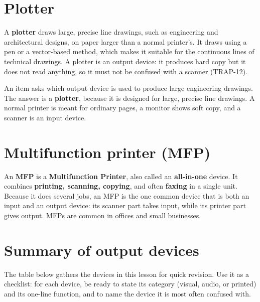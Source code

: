 \section{Plotter}
A \textbf{plotter} draws large, precise line drawings, such as engineering and
architectural designs, on paper larger than a normal printer's. It draws using
a pen or a vector-based method, which makes it suitable for the continuous
lines of technical drawings. A plotter is an output device: it produces hard
copy but it does not read anything, so it must not be confused with a scanner
(TRAP-12).

\begin{example}
An item asks which output device is used to produce large engineering
drawings. The answer is a \textbf{plotter}, because it is designed for large,
precise line drawings. A normal printer is meant for ordinary pages, a monitor
shows soft copy, and a scanner is an input device.
\end{example}

\section{Multifunction printer (MFP)}
An \textbf{MFP} is a \textbf{Multifunction Printer}, also called an
\textbf{all-in-one} device. It combines \textbf{printing, scanning, copying},
and often \textbf{faxing} in a single unit. Because it does several jobs, an
MFP is the one common device that is both an input and an output device: its
scanner part takes input, while its printer part gives output. MFPs are common
in offices and small businesses.

\section{Summary of output devices}
The table below gathers the devices in this lesson for quick revision. Use it
as a checklist: for each device, be ready to state its category (visual,
audio, or printed) and its one-line function, and to name the device it is
most often confused with.

